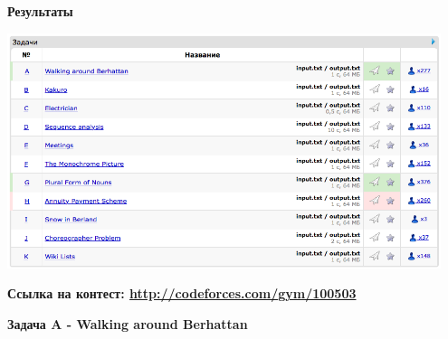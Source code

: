 \documentclass[a4paper,12pt]{article}
\begin{document}
\textbf{{\large Результаты}} \\
\begin{center}
\includegraphics[width=0.95\textwidth]{CT_S02E05/CT_S02E05_result-old.png}\\ [1cm]
\end{center}

\textbf{{\large Ссылка на контест: \url{http://codeforces.com/gym/100503}}}

\newpage
\textbf{{\large Задача A - Walking around Berhattan}}
\end{document}
